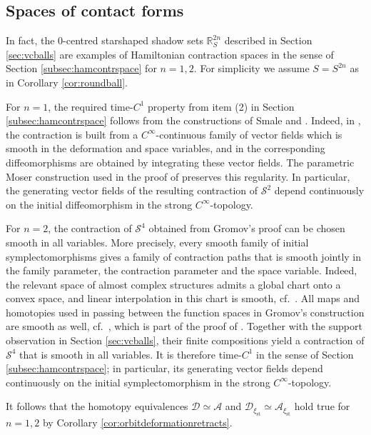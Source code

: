 \documentclass{amsart}
\theoremstyle{definition}
\newcommand{\AAA}{\mathcal A}
\newcommand{\DD}{\mathcal D}
\newcommand{\R}{\mathbb R}
\renewcommand{\SS}{\mathcal S}
\DeclareMathOperator{\st}{\mathrm{st}}
\begin{document}

\subsection{Spaces of contact forms\label{sec:spofcontforms}}


In fact,
the $0$-centred starshaped shadow sets $\R^{2n}_S$
described in Section \ref{sec:vcballs}
are examples of Hamiltonian contraction spaces
in the sense of Section \ref{subsec:hamcontrspace}
for $n=1,2$.
For simplicity we assume $S=S^{2n}$
as in Corollary \ref{cor:roundball}.

For $n=1$, the required time-$C^1$ property
from item (2) in Section \ref{subsec:hamcontrspace}
follows from the constructions of Smale \cite{sm59}
and \cite[Section~3]{agz22}.
Indeed,
in \cite[Lemma~1]{sm59},
the contraction is built
from a $C^{\infty}$-continuous family of vector fields
which is smooth in the deformation and space variables,
and in \cite[Lemma~2]{sm59} the corresponding diffeomorphisms
are obtained by integrating these vector fields.
The parametric Moser construction used in
the proof of \cite[Theorem~1.8]{agz22} preserves this regularity.
In particular,
the generating vector fields
of the resulting contraction of $\SS^2$
depend continuously on the initial diffeomorphism
in the strong $C^{\infty}$-topology.

For $n=2$,
the contraction of $\SS^4$
obtained from Gromov's proof \cite{grom85}
can be chosen smooth in all variables.
More precisely, every smooth family
of initial symplectomorphisms gives a family
of contraction paths that is smooth jointly
in the family parameter,
the contraction parameter and the space variable.
Indeed,
the relevant space of almost complex structures
admits a global chart onto a convex space,
and linear interpolation in this chart is smooth,
cf.\ \cite[p.~32]{gz23}.
All maps and homotopies used in passing between
the function spaces in Gromov's construction
are smooth as well,
cf.\ \cite[Lemma~9.5.6]{mcsa12},
which is part of the proof of
\cite[Theorem~9.5.2]{mcsa12}.
Together with the support observation in
Section \ref{sec:vcballs},
their finite compositions yield a contraction of $\SS^4$
that is smooth in all variables.
It is therefore time-$C^1$ in the sense of
Section \ref{subsec:hamcontrspace};
in particular, its generating vector fields
depend continuously on the initial symplectomorphism
in the strong $C^\infty$-topology.

It follows that
the homotopy equivalences
$\DD\simeq\AAA$ and
$\DD_{\xi_{\st}}\!\simeq\AAA_{\xi_{\st}}$
hold true for $n=1,2$
by Corollary \ref{cor:orbitdeformationretracts}.
\end{document}
